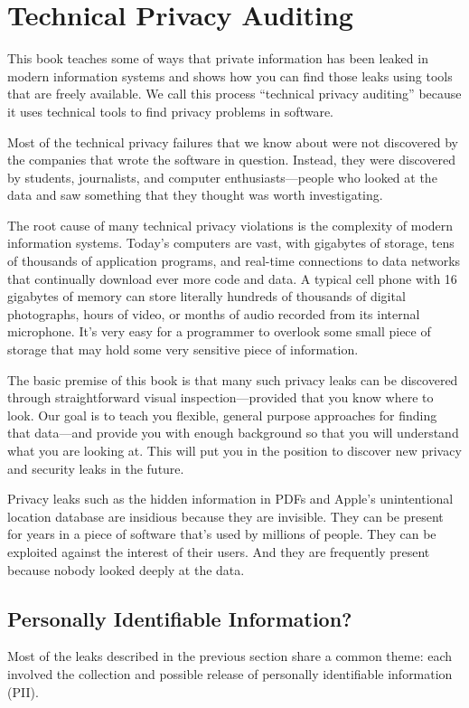\section{Technical Privacy Auditing}

This book teaches some of  ways that private information has been
leaked in modern information systems and shows how you can find 
those leaks using tools that are freely available. We call this
process ``technical privacy auditing'' because it uses technical
tools to find privacy problems in software.

Most of the technical privacy failures that we know about were not
discovered by the companies that wrote the software in
question. Instead, they were discovered by students,
journalists, and computer enthusiasts---people who looked at the data
and saw something that they thought was worth investigating.

The root cause of many technical privacy violations is the complexity
of modern information systems. Today's computers are vast, with
gigabytes of storage, tens of thousands of application programs, and
real-time connections to data networks that continually download ever 
more code and data. A typical cell phone with 16 gigabytes of memory can
store literally hundreds of thousands of digital photographs, hours of
video, or months of audio recorded from its internal
microphone. It's very easy for a programmer to overlook some small
piece of storage that may hold some very sensitive piece of
information. 

The basic premise of this book is that many such privacy leaks can be
discovered through straightforward visual inspection---provided that
you know where to look. Our goal is to teach you flexible, general
purpose approaches for finding that data---and provide you with enough
background so that you will understand what you are looking at. This
will put you in the position to discover new privacy and security
leaks in the future.

Privacy leaks such as the hidden information in PDFs and Apple's
unintentional location database are insidious because they are
invisible. They can be present for years in a piece of software that's
used by millions of people. They can be exploited against the interest
of their users. And they are frequently present because nobody looked deeply at the data. 

\subsection{Personally Identifiable Information?}
Most of the leaks described in the previous section share a common
theme: each involved the collection and possible release of personally
identifiable information (PII).

